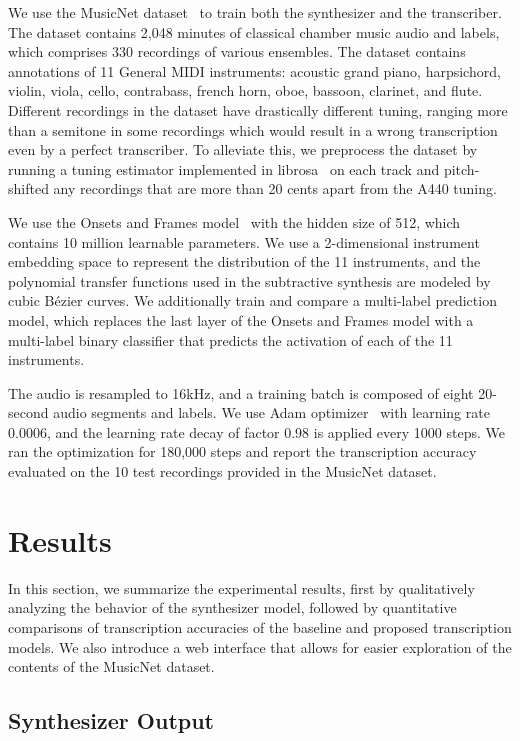 We use the MusicNet dataset~\cite{thickstun2017musicnet} to train both the synthesizer and the transcriber.
The dataset contains 2,048 minutes of classical chamber music audio and labels, which comprises 330 recordings of various ensembles.
The dataset contains annotations of 11 General MIDI instruments: acoustic grand piano, harpsichord, violin, viola, cello, contrabass, french horn, oboe, bassoon, clarinet, and flute.
Different recordings in the dataset have drastically different tuning, ranging more than a semitone in some recordings which would result in a wrong transcription even by a perfect transcriber.
To alleviate this, we preprocess the dataset by running a tuning estimator implemented in librosa~\cite{mcfee2015librosa} on each track and pitch-shifted any recordings that are more than 20 cents apart from the A440 tuning.

We use the Onsets and Frames model~\cite{hawthorne2018onsetsframes} with the hidden size of 512, which contains 10 million learnable parameters.
We use a 2-dimensional instrument embedding space to represent the distribution of the 11 instruments, and the polynomial transfer functions used in the subtractive synthesis are modeled by cubic B\'{e}zier curves.
We additionally train and compare a multi-label prediction model, which replaces the last layer of the Onsets and Frames model with a multi-label binary classifier that predicts the activation of each of the 11 instruments.

The audio is resampled to 16kHz, and a training batch is composed of eight 20-second audio segments and labels.
We use Adam optimizer~\cite{kingma2015adam} with learning rate 0.0006, and the learning rate decay of factor 0.98 is applied every 1000 steps.
We ran the optimization for 180,000 steps and report the transcription accuracy evaluated on the 10 test recordings provided in the MusicNet dataset.

\section{Results}

In this section, we summarize the experimental results, first by qualitatively analyzing the behavior of the synthesizer model, followed by quantitative comparisons of transcription accuracies of the baseline and proposed transcription models.
We also introduce a web interface that allows for easier exploration of the contents of the MusicNet dataset.

\subsection{Synthesizer Output}

